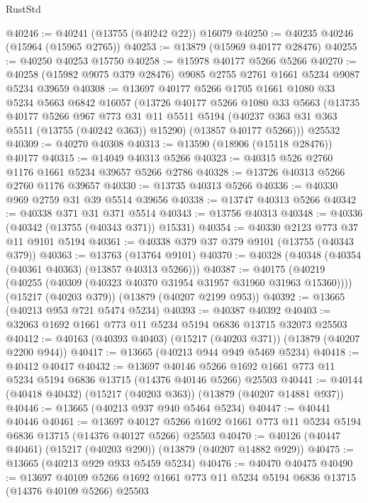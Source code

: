 \begin{lexlean}{RustStd}
\begin{coremodule}
@40246 := @40241 (@13755 (@40242 @22)) @16079
@40250 := @40235 @40246 (@15964 (@15965 @2765))
@40253 := @13879 (@15969 @40177 @28476)
@40255 := @40250 @40253 @15750
@40258 := @15978 @40177 @5266 @5266
@40270 := @40258 (@15982 @9075 @379 @28476) @9085 @2755 @2761 @1661 @5234 @9087 @5234 @39659
@40308 := @13697
    @40177
    @5266
    @1705
    @1661
    @1080
    @33
    @5234
    @5663
    @6842
    @16057
    (@13726
      @40177
      @5266
      @1080
      @33
      @5663
      (@13735
        @40177
        @5266
        @967
        @773
        @31
        @11
        @5511
        @5194
        (@40237 @363 @31 @363 @5511 (@13755 (@40242 @363)) @15290)
        (@13857 @40177 @5266)))
    @25532
@40309 := @40270 @40308
@40313 := @13590 (@18906 (@15118 @28476)) @40177
@40315 := @14049 @40313 @5266
@40323 := @40315 @526 @2760 @1176 @1661 @5234 @39657 @5266 @2786
@40328 := @13726 @40313 @5266 @2760 @1176 @39657
@40330 := @13735 @40313 @5266
@40336 := @40330 @969 @2759 @31 @39 @5514 @39656
@40338 := @13747 @40313 @5266
@40342 := @40338 @371 @31 @371 @5514
@40343 := @13756 @40313
@40348 := @40336 (@40342 (@13755 (@40343 @371)) @15331)
@40354 := @40330 @2123 @773 @37 @11 @9101 @5194
@40361 := @40338 @379 @37 @379 @9101 (@13755 (@40343 @379))
@40363 := @13763 (@13764 @9101)
@40370 := @40328 (@40348 (@40354 (@40361 @40363) (@13857 @40313 @5266)))
@40387 := @40175
    (@40219 (@40255 (@40309 (@40323 @40370 @31954 @31957 @31960 @31963 @15360))))
    (@15217 (@40203 @379))
    (@13879 (@40207 @2199 @953))
@40392 := @13665 (@40213 @953 @721 @5474 @5234)
@40393 := @40387 @40392
@40403 := @32063 @1692 @1661 @773 @11 @5234 @5194 @6836 @13715 @32073 @25503
@40412 := @40163 (@40393 @40403) (@15217 (@40203 @371)) (@13879 (@40207 @2200 @944))
@40417 := @13665 (@40213 @944 @949 @5469 @5234)
@40418 := @40412 @40417
@40432 := @13697
    @40146
    @5266
    @1692
    @1661
    @773
    @11
    @5234
    @5194
    @6836
    @13715
    (@14376 @40146 @5266)
    @25503
@40441 := @40144 (@40418 @40432) (@15217 (@40203 @363)) (@13879 (@40207 @14881 @937))
@40446 := @13665 (@40213 @937 @940 @5464 @5234)
@40447 := @40441 @40446
@40461 := @13697
    @40127
    @5266
    @1692
    @1661
    @773
    @11
    @5234
    @5194
    @6836
    @13715
    (@14376 @40127 @5266)
    @25503
@40470 := @40126 (@40447 @40461) (@15217 (@40203 @290)) (@13879 (@40207 @14882 @929))
@40475 := @13665 (@40213 @929 @933 @5459 @5234)
@40476 := @40470 @40475
@40490 := @13697
    @40109
    @5266
    @1692
    @1661
    @773
    @11
    @5234
    @5194
    @6836
    @13715
    (@14376 @40109 @5266)
    @25503

\end{coremodule}
\end{lexlean}
